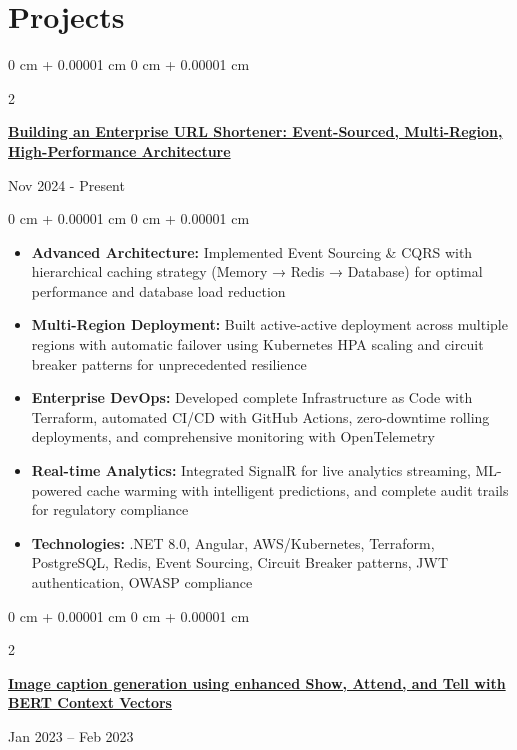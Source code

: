 \documentclass[10pt, letterpaper]{article}
\newenvironment{highlights}{
    \begin{itemize}[
        topsep=0.10 cm,
        parsep=0.10 cm,
        partopsep=0pt,
        itemsep=0pt,
        leftmargin=0 cm + 10pt
    ]
}{
    \end{itemize}
} %
\newenvironment{onecolentry}{
    \begin{adjustwidth}{
        0 cm + 0.00001 cm
    }{
        0 cm + 0.00001 cm
    }
}{
    \end{adjustwidth}
} %
\newenvironment{twocolentry}[2][]{
    \onecolentry
    \def\secondColumn{#2}
    \setcolumnwidth{\fill, 4.5 cm}
    \begin{paracol}{2}
}{
    \switchcolumn \raggedleft \secondColumn
    \end{paracol}
    \endonecolentry
} %
\begin{document}
\section{Projects}
               \begin{twocolentry}{
            {Nov 2024 - Present}
        }
            \href{https://github.com/thromel/URLShortener}{\textbf{Building an Enterprise URL Shortener: Event-Sourced, Multi-Region, High-Performance Architecture}}
        \end{twocolentry}
        \begin{onecolentry}
            \begin{highlights}
                \item \textbf{Advanced Architecture:} Implemented Event Sourcing \& CQRS with hierarchical caching strategy (Memory → Redis → Database) for optimal performance and database load reduction
                \item \textbf{Multi-Region Deployment:} Built active-active deployment across multiple regions with automatic failover using Kubernetes HPA scaling and circuit breaker patterns for unprecedented resilience
                \item \textbf{Enterprise DevOps:} Developed complete Infrastructure as Code with Terraform, automated CI/CD with GitHub Actions, zero-downtime rolling deployments, and comprehensive monitoring with OpenTelemetry
                \item \textbf{Real-time Analytics:} Integrated SignalR for live analytics streaming, ML-powered cache warming with intelligent predictions, and complete audit trails for regulatory compliance
                \item \textbf{Technologies:} .NET 8.0, Angular, AWS/Kubernetes, Terraform, PostgreSQL, Redis, Event Sourcing, Circuit Breaker patterns, JWT authentication, OWASP compliance
            \end{highlights}
                
        \end{onecolentry}

        \begin{twocolentry}{
    {Jan 2023 – Feb 2023}
}
    \href{https://github.com/thromel/Image-Captioning-ML-Project}{\textbf{Image caption generation using enhanced Show, Attend, and Tell with BERT Context Vectors}}
\end{twocolentry}
\end{document}
